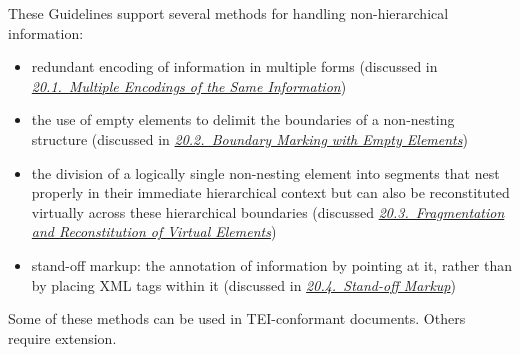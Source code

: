 These Guidelines support several methods for handling non-hierarchical information: \begin{itemize}
\item \par
redundant encoding of information in multiple forms (discussed in \textit{\hyperref[NHME]{20.1.\ Multiple Encodings of the Same Information}})
\item \par
the use of empty elements to delimit the boundaries of a non-nesting structure (discussed in \textit{\hyperref[NHBM]{20.2.\ Boundary Marking with Empty Elements}})
\item \par
the division of a logically single non-nesting element into segments that nest properly in their immediate hierarchical context but can also be reconstituted virtually across these hierarchical boundaries (discussed \textit{\hyperref[NHVE]{20.3.\ Fragmentation and Reconstitution of Virtual Elements}})
\item \par
stand-off markup: the annotation of information by pointing at it, rather than by placing XML tags within it (discussed in \textit{\hyperref[NHSO]{20.4.\ Stand-off Markup}})
\end{itemize}  Some of these methods can be used in TEI-conformant documents. Others require extension.\par
